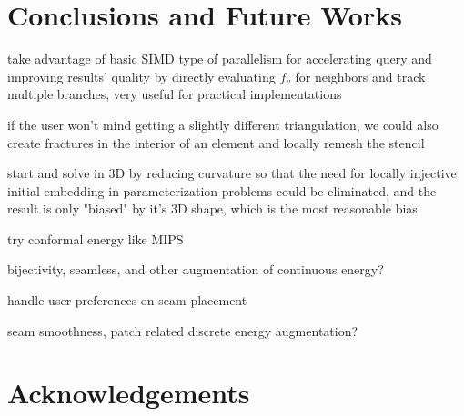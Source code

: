 \section{Conclusions and Future Works}

take advantage of basic SIMD type of parallelism for accelerating query and improving results' quality by directly evaluating $f_v$ for neighbors and track multiple branches, very useful for practical implementations

if the user won't mind getting a slightly different triangulation, we could also create fractures in the interior of an element and locally remesh the stencil

start and solve in 3D by reducing curvature so that the need for locally injective initial embedding in parameterization problems could be eliminated, and the result is only "biased" by it's 3D shape, which is the most reasonable bias

try conformal energy like MIPS

bijectivity, seamless, and other augmentation of continuous energy?

handle user preferences on seam placement

seam smoothness, patch related discrete energy augmentation?

\section{Acknowledgements}